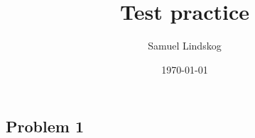 \documentclass{article}
\title{Test practice}
\author{Samuel Lindskog}
\date\today
\begin{document}
\maketitle
\subsection*{Problem 1}
\end{document}
